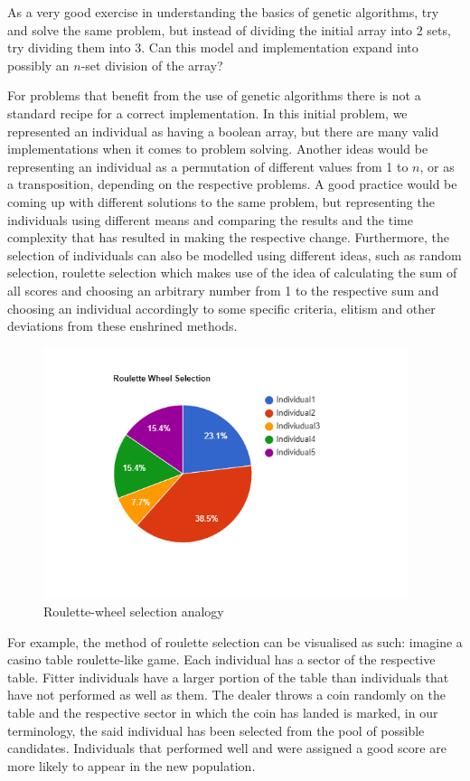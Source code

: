 \documentclass[letterpaper]{article}
\begin{document}
As a very good exercise in understanding the basics of genetic algorithms, try and solve the same problem, but instead of dividing the initial array into 2 sets, try dividing them into 3. Can this model and implementation expand into possibly an $n$-set division of the array?

For problems that benefit from the use of genetic algorithms there is not a standard recipe for a correct implementation. In this initial problem, we represented an individual as having a boolean array, but there are many valid implementations when it comes to problem solving. Another ideas would be representing an individual as a permutation of different values from 1 to $n$, or as a transposition, depending on the respective problems. A good practice would be coming up with different solutions to the same problem, but representing the individuals using different means and comparing the results and the time complexity that has resulted in making the respective change. Furthermore, the selection of individuals can also be modelled using different ideas, such as random selection, roulette selection which makes use of the idea of calculating the sum of all scores and choosing an arbitrary number from 1 to the respective sum and choosing an individual accordingly to some specific criteria, elitism and other deviations from these enshrined methods.

\begin{figure} [h!]
\centering
\includegraphics[width=0.95\textwidth]{pngOfDiagrams/geneticalgo2dpiechart.png}
\caption{Roulette-wheel selection analogy}
\end{figure}

For example, the method of roulette selection can be visualised as such: imagine a casino table roulette-like game. Each individual has a sector of the respective table. Fitter individuals have a larger portion of the table than individuals that have not performed as well as them. The dealer throws a coin randomly on the table and the respective sector in which the coin has landed is marked, in our terminology, the said individual has been selected from the pool of possible candidates. Individuals that performed well and were assigned a good score are more likely to appear in the new population.
\end{document}
